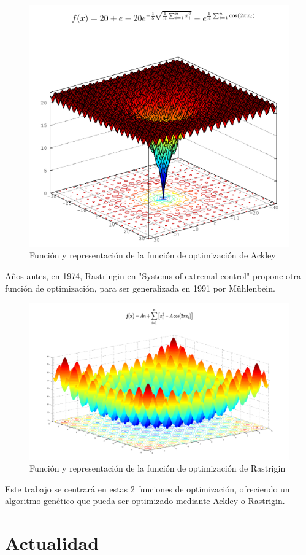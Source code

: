 \bigskip
\begin{figure}[h]
	\centering
	\includegraphics[width=0.7\linewidth]{../images/ackley}
	\caption[Función y representación de la función de optimización de Ackley]{Función y representación de la función de optimización de Ackley}
	\label{fig:ackley}
\end{figure}


\bigskip
Años antes, en 1974, Rastringin en "Systems of extremal control" propone otra función de optimización, para ser generalizada en 1991 por Mühlenbein.


\bigskip
\begin{figure}[h]
	\centering
	\includegraphics[width=0.7\linewidth]{../images/rastrigin}
	\caption[Función y representación de la función de optimización de Rastrigin]{Función y representación de la función de optimización de Rastrigin}
	\label{fig:rastrigin}
\end{figure}

\bigskip
Este trabajo se centrará en estas 2 funciones de optimización, ofreciendo un algoritmo genético que pueda ser optimizado mediante Ackley o Rastrigin.


\newpage
\section{Actualidad}
\bigskip

